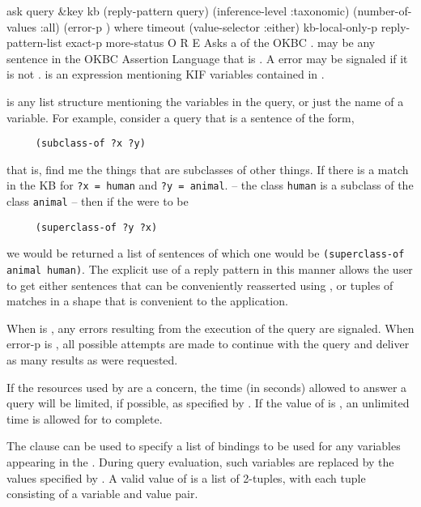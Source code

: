 \begin{okbcop}{ask}{ query \&key kb (reply-pattern query) (inference-level :taxonomic) (number-of-values :all) (error-p \true) where timeout (value-selector :either) kb-local-only-p} { reply-pattern-list exact-p more-status } { O } { R } { E }
Asks a  of the OKBC .   may be any
   sentence in the OKBC Assertion Language that is .  A
    error
   may be signaled if it is not .  is an
   expression mentioning KIF variables contained in .

    is any list structure mentioning the variables
   in the query, or just the name of a variable.  For example, consider
   a query that is a sentence of the form,
   \begin{verbatim}
     (subclass-of ?x ?y)
   \end{verbatim}
   that is, find me the things that are subclasses of other things.  If there
   is a match in the KB for {\tt ?x = human} and {\tt ?y = animal}.
   -- the class {\tt human} is a subclass of the class {\tt animal} -- then
   if the  were to be
   \begin{verbatim}
     (superclass-of ?y ?x)
   \end{verbatim}
   we would be returned a list of sentences of which one
   would be {\tt (superclass-of animal human)}.  The explicit use of a reply
   pattern in this manner allows the user to get either sentences
   that can be conveniently reasserted using , or tuples of
   matches in a shape that is convenient to the application.

   When  is \true, any errors resulting from the execution of
   the query are signaled.  When error-p is \false, all possible attempts are
   made to continue with the query and deliver as many results as were
   requested.

   If the resources used by  are a concern, the time (in
   seconds) allowed to answer a query will be limited, if possible, as
   specified by .  If the value of  is
   \false, an unlimited time is allowed for  to complete.

   The  clause can be used to specify a list of bindings to
   be used for any variables appearing in the .  During query
   evaluation, such variables are replaced by the values specified by
   .  A valid value of  is a list of 2-tuples,
   with each tuple consisting of a variable and value pair.


\end{okbcop}
